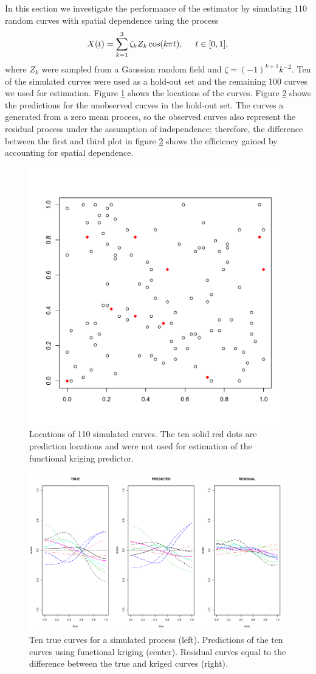 In this section we investigate the performance of the estimator by simulating 110 random curves with spatial dependence using the process 
\begin{equation}
	X(t) = \sum^{3}_{k=1}\zeta_k Z_k \cos(k\pi t), \hspace{0.5cm} t \in [0,1], \label{eq:sim process2} 
\end{equation}
where $Z_k$ were sampled from a Gaussian random field and \(\zeta=(-1)^{k+1}k^{-2}\). Ten of the simulated curves were used as a hold-out set and the remaining 100 curves we used for estimation. Figure \ref{fig:locations} shows the locations of the curves. Figure \ref{fig:curve kriging predictions} shows the predictions for the unobserved curves in the hold-out set. The curves a generated from a zero mean process, so the observed curves also represent the residual process under the assumption of independence; therefore, the difference between the first and third plot in figure \ref{fig:curve kriging predictions} shows the efficiency gained by accounting for spatial dependence.
\begin{figure}
	\begin{center}
		\includegraphics[width=0.5
		\textwidth]{images/kriging/locations.pdf} 
	\end{center}
	\caption{Locations of 110 simulated curves. The ten solid red dots are prediction locations and were not used for estimation of the functional kriging predictor.} \label{fig:locations} 
\end{figure}
\begin{figure}
	\begin{center}
		\includegraphics[width=0.6
		\textwidth]{images/kriging/residual-curves.pdf} 
	\end{center}
	\caption{Ten true curves for a simulated process (left). Predictions of the ten curves using functional kriging (center). Residual curves equal to the difference between the true and kriged curves (right). } \label{fig:curve kriging predictions} 
\end{figure}

